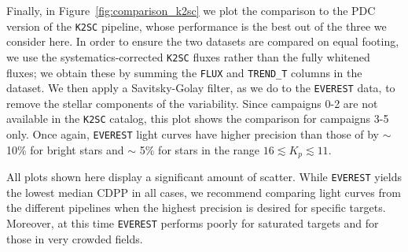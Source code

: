 \documentclass[]{emulateapj}
\begin{document}
Finally, in Figure~\ref{fig:comparison_k2sc} we plot the comparison to the PDC version
of the \texttt{K2SC}
pipeline, whose performance is the best out of the three we consider here. In order to 
ensure the two datasets are compared on equal footing, we use the systematics-corrected
\texttt{K2SC} fluxes rather than the fully whitened fluxes; we obtain these by
summing the \texttt{FLUX} and \texttt{TREND\_T} columns in the dataset. We then apply
a Savitsky-Golay filter, as we do to the \texttt{EVEREST} data, to remove the stellar 
components of the variability. Since campaigns 0-2 are not available in the \texttt{K2SC}
catalog, this plot shows the comparison for campaigns 3-5 only.
Once again, \texttt{EVEREST} light curves have higher precision than those of
 by $\sim$ 10\% for bright stars and $\sim$ 5\% for stars in the range
$16 \lesssim K_p \lesssim 11$.

All plots shown here display a significant amount of scatter. While \texttt{EVEREST}
yields the lowest median CDPP in all cases, we recommend comparing light curves from
the different pipelines when the highest precision is desired for specific targets.
Moreover, at this time \texttt{EVEREST} performs poorly for saturated
targets and for those in very crowded fields.
\end{document}
